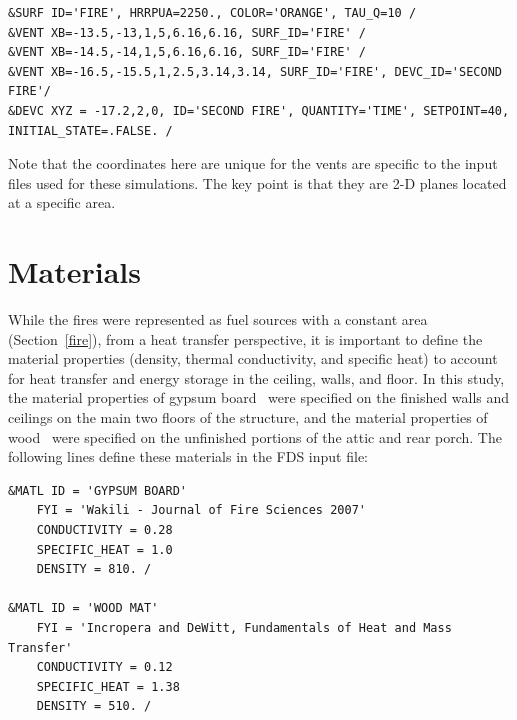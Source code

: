 \documentclass[12pt,oneside]{book}
\begin{document}
\begin{lstlisting}
&SURF ID='FIRE', HRRPUA=2250., COLOR='ORANGE', TAU_Q=10 /
&VENT XB=-13.5,-13,1,5,6.16,6.16, SURF_ID='FIRE' / 
&VENT XB=-14.5,-14,1,5,6.16,6.16, SURF_ID='FIRE' / 
&VENT XB=-16.5,-15.5,1,2.5,3.14,3.14, SURF_ID='FIRE', DEVC_ID='SECOND FIRE'/ 
&DEVC XYZ = -17.2,2,0, ID='SECOND FIRE', QUANTITY='TIME', SETPOINT=40, INITIAL_STATE=.FALSE. /
\end{lstlisting}
Note that the coordinates here are unique for the vents are specific to the input files used for these simulations. The key point is that they are 2-D planes located at a specific area.


\clearpage


\section{Materials}
\label{matl}
While the fires were represented as fuel sources with a constant area (Section~\ref{fire}), from a heat transfer perspective, it is important to define the material properties (density, thermal conductivity, and specific heat) to account for heat transfer and energy storage in the ceiling, walls, and floor. In this study, the material properties of gypsum board~\cite{WAKILI2007} were specified on the finished walls and ceilings on the main two floors of the structure, and the material properties of wood~\cite{Incropera:1} were specified on the unfinished portions of the attic and rear porch. The following lines define these materials in the FDS input file:

\begin{lstlisting}
&MATL ID = 'GYPSUM BOARD'
    FYI = 'Wakili - Journal of Fire Sciences 2007' 
    CONDUCTIVITY = 0.28
    SPECIFIC_HEAT = 1.0
    DENSITY = 810. /

&MATL ID = 'WOOD MAT'
    FYI = 'Incropera and DeWitt, Fundamentals of Heat and Mass Transfer'
    CONDUCTIVITY = 0.12
    SPECIFIC_HEAT = 1.38
    DENSITY = 510. / 
\end{lstlisting}
\end{document}
